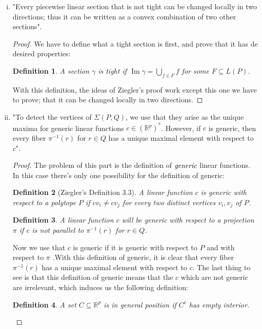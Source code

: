 \documentclass[11pt]{article}
\newtheorem{definition}{Definition}[section]
\DeclareMathOperator{\im}{Im}
\DeclareMathOperator{\im}{im}
\begin{document}
\begin{enumerate}
\begin{enumerate}[(i)]
\item "Every piecewise linear section that is not tight can be changed locally in two directions; thus it can be written as a convex combination of two other sections".

\begin{proof}
We have to define what a tight section is first, and prove that it has de desired properties:

\begin{definition}
A section $\gamma$ is tight if $\im \gamma = \bigcup_{f \in F}f$ for some $F \subseteq L(P)$. 
\end{definition}
With this definition, the ideas of Ziegler's proof work except this one we have to prove; that it can be changed locally in two directions.
\end{proof}


\item "To detect the vertices of $\Sigma(P, Q)$, we use that they arise as the unique maxima for generic linear functions $c \in (\mathbb{R}^p)^*$. However, if $c$ is generic, then
every fiber $\pi^{-1}(r)$ for $ r \in Q$ has a unique maximal element with respect to $c$".

\begin{proof}
The problem of this part is the definition of $\emph{generic}$ linear functions. In this case there's only one possibility for the definition of generic:

\begin{definition} [Ziegler's Definition 3.3]
A linear function $c$ is generic with respect to a polytope $P$ if $cv_i \not= cv_j$ for every two distinct vertices $v_i, v_j$ of $P$.
\end{definition}

\begin{definition}
A linear function $c$ will be generic with respect to a projection $\pi$ if $c$ is not parallel to $\pi^{-1}(r)$ for $r \in Q$.
\end{definition}


Now we use that $c$ is generic if it is generic with respect to $P$ and with respect to $\pi$ .With this definition of generic, it is clear that every fiber $\pi^{-1}(r)$ has a unique maximal element with respect to $c$.
\newline 
The last thing to see is that this definition of generic means that the $c$ which are not generic are irrelevant, which induces us the following definition:

\begin{definition}
A set $C \subseteq \mathbb{R}^p$ is in general position if $C^c$ has empty interior.
\end{definition}


\end{proof}
\end{enumerate}
\end{enumerate}
\end{document}
